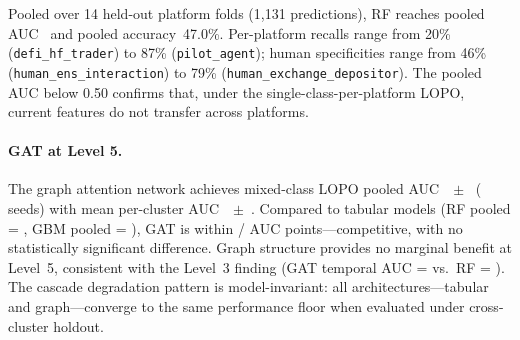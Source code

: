 \documentclass[10pt]{article}
\begin{document}
Pooled over 14 held-out platform folds (1{,}131 predictions), RF reaches pooled AUC~\lopoRfPooledAuc{} and pooled accuracy~47.0\%. Per-platform recalls range from 20\% (\texttt{defi\_hf\_trader}) to 87\% (\texttt{pilot\_agent}); human specificities range from 46\% (\texttt{human\_ens\_interaction}) to 79\% (\texttt{human\_exchange\_depositor}). The pooled AUC below 0.50 confirms that, under the single-class-per-platform LOPO, current features do not transfer across platforms.

\paragraph{GAT at Level 5.} The graph attention network achieves mixed-class LOPO pooled AUC~\gatMixedClassLopoPooledAuc{}~$\pm$~\gatMixedClassLopoPooledAucStd{} (\gatMixedClassLopoNSeeds{} seeds) with mean per-cluster AUC~\gatMixedClassLopoMeanClusterAuc{}~$\pm$~\gatMixedClassLopoMeanClusterAucStd{}. Compared to tabular models (RF pooled = \mixedClassLopoRfAuc{}, GBM pooled = \mixedClassLopoGbmAuc{}), GAT is within \gatVsRfLopoDelta{} / \gatVsGbmLopoDelta{} AUC points---competitive, with no statistically significant difference. Graph structure provides no marginal benefit at Level~5, consistent with the Level~3 finding (GAT temporal AUC = \gatTemporalMeanAuc{} vs.\ RF = \temporalHoldoutRfAuc{}). The cascade degradation pattern is model-invariant: all architectures---tabular and graph---converge to the same performance floor when evaluated under cross-cluster holdout.
\end{document}
